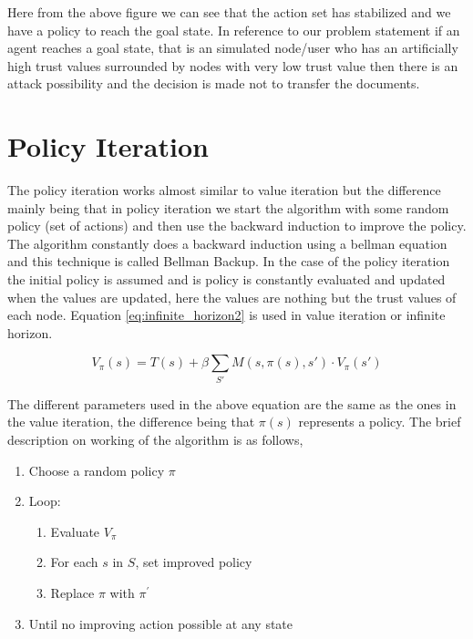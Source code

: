 Here from the above figure we can see that the action set has stabilized and we
have a policy to reach the goal state. In reference to our problem statement if
an agent reaches a goal state, that is  an simulated node/user who has an
artificially high trust values surrounded by nodes with very low trust value
then there is an attack possibility and the decision is made not to transfer the
documents.

\section{Policy Iteration}

The policy iteration works almost similar to value iteration but the difference
mainly being that in policy iteration we start the algorithm with some random
policy (set of actions) and then use the backward induction to improve the
policy. The algorithm constantly does a backward induction using a bellman
equation \autocite{Wikipedia2013} and this technique is called Bellman Backup. In the case of the
policy iteration the initial policy is assumed and is policy is constantly
evaluated and updated when the values are updated, here the values are nothing
but the trust values of each node.  Equation \ref{eq:infinite_horizon2} is used in value iteration
or infinite horizon.

\begin{equation} 
    \label{eq:infinite_horizon2}
    V_\pi(s) = T(s) + \beta \sum_{S'} M(s,\pi(s),s') \cdot V_\pi(s')
\end{equation}


The different parameters used in the above equation are the same as the ones in
the value iteration, the difference being that $\pi(s)$ represents a policy. The brief
description on working of the algorithm is as follows, 
\begin{enumerate}
    \item Choose a random policy $\pi$
    \item Loop: 
        \begin{enumerate}
            \item Evaluate $V_\pi$ 
            \item For each $s$ in $S$, set improved policy
            \item Replace $\pi$ with $\pi^\prime$ 
        \end{enumerate}
        \item Until no improving action possible at any state
\end{enumerate}

